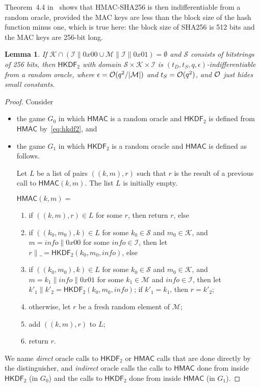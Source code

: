 \documentclass[compsoc, conference, letterpaper, 10pt, times]{IEEEtran}
\newcommand{\HKDF}{\mathsf{HKDF}}
\newtheorem{lemma}{Lemma}
\newcommand{\hkdftwo}{\HKDF_2}
\newcommand{\info}{\mathit{info}}
\newcommand{\hmac}{\mathsf{HMAC}}
\newcommand{\Ssalt}{\mathcal{S}}
\newcommand{\Skey}{\mathcal{K}}
\newcommand{\Sinfo}{\mathcal{I}}
\newcommand{\Smac}{\mathcal{M}}
\begin{document}
Theorem~4.4 in~\cite{Dodis12} shows that HMAC-SHA256 is then indifferentiable from a random oracle, provided the MAC keys are less than the block size of the hash function minus one, which is true here: the block size of SHA256 is 512 bits and the MAC keys are 256-bit long.

\begin{lemma}
If $\Skey \cap (\Sinfo \| 0x00 \cup \Smac \| \Sinfo \| 0x01) = \emptyset$
and $\Ssalt$ consists of bitstrings of 256 bits,
then $\hkdftwo$ with domain $\Ssalt \times \Skey \times \Sinfo$ is
$(t_D, t_S, q, \epsilon)$-indifferentiable from a random oracle,
where $\epsilon = {\cal O}(q^2/|\Smac|)$ and $t_S = {\cal O}(q^2)$,
and ${\cal O}$ just hides small constants.
\end{lemma}
\begin{proof}
Consider
\begin{itemize}[leftmargin=*]
\item  the game $G_0$ in which $\hmac$ is a random oracle and $\hkdftwo$ is 
defined from $\hmac$ by~\eqref{eq:hkdf2}, and
\item the game $G_1$ in which $\hkdftwo$ is a random oracle and $\hmac$ is
defined as follows.

Let $L$ be a list of pairs $((k,m),r)$ such that $r$ is the result of a previous call
to $\hmac(k,m)$. The list $L$ is initially empty.

$\hmac(k,m) =$
\begin{enumerate}[leftmargin=*]
\item\label{step:previousresult} if $((k,m),r) \in L$ for some $r$, then return $r$, else
\item\label{step:firsthalf} if $((k_0,m_0),k) \in L$ for some $k_0 \in \Ssalt$ and $m_0 \in \Skey$, 
and $m = \info \|0x00$ for some $\info \in \Sinfo$,
then let $r \|\_ = \hkdftwo(k_0,m_0,\info)$, else
\item\label{step:secondhalf} if $((k_0,m_0),k) \in L$ for some $k_0 \in \Ssalt$ and $m_0 \in \Skey$, 
and $m = k_1 \| \info \|0x01$ for some $k_1 \in \Smac$ and $\info \in \Sinfo$,
then let $k'_1 \| k'_2 =  \hkdftwo(k_0,m_0,\info)$;
if $k'_1 = k_1$, then $r = k'_2$;
\item\label{step:fresh} otherwise, let $r$ be a fresh random element of $\Smac$;
\item\label{step:add} add $((k,m),r)$ to $L$;
\item\label{step:return} return $r$.
\end{enumerate}

\end{itemize}
We name \emph{direct} oracle calls to $\hkdftwo$ or $\hmac$ calls 
that are done directly by the distinguisher, and \emph{indirect} oracle calls
the calls to $\hmac$ done from inside $\hkdftwo$ (in $G_0$) and 
the calls to $\hkdftwo$ done from inside $\hmac$ (in $G_1$).


\end{proof}
\end{document}

